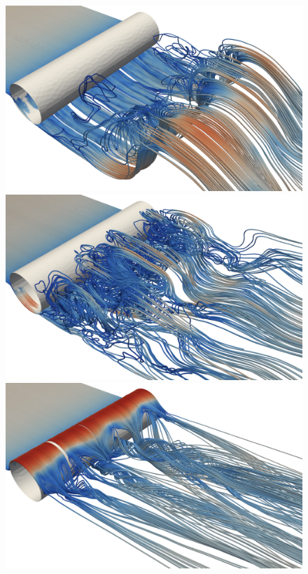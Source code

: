 \begin{figure}
  \centering
  \includegraphics[width=\twofigs]{chapters/hoffman-1/png/Hoffman_fig5a.png}
  \includegraphics[width=\twofigs]{chapters/hoffman-1/png/Hoffman_fig5b.png} \\
  \includegraphics[width=\twofigs]{chapters/hoffman-1/png/Hoffman_fig5c.png}

\end{figure}
